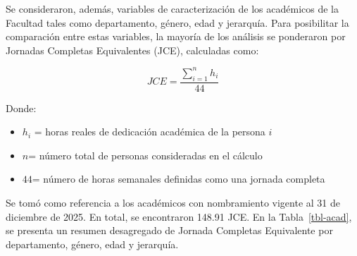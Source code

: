 \documentclass[
  spanish,
  a4paper,
  oneside]{scrbook}
\begin{document}
Se consideraron, además, variables de caracterización de los académicos
de la Facultad tales como departamento, género, edad y jerarquía. Para
posibilitar la comparación entre estas variables, la mayoría de los
análisis se ponderaron por Jornadas Completas Equivalentes (JCE),
calculadas como:

\[JCE = \frac{\sum_{i=1}^{n} h_i}{44}\]

Donde:

\begin{itemize}
\item
  \(h_i\) = horas reales de dedicación académica de la persona \(i\)
\item
  \(n\)= número total de personas consideradas en el cálculo
\item
  \(44\)= número de horas semanales definidas como una jornada completa
\end{itemize}

Se tomó como referencia a los académicos con nombramiento vigente al 31
de diciembre de 2025. En total, se encontraron 148.91 JCE. En la
Tabla~\ref{tbl-acad}, se presenta un resumen desagregado de Jornada
Completas Equivalente por departamento, género, edad y jerarquía.
\end{document}
